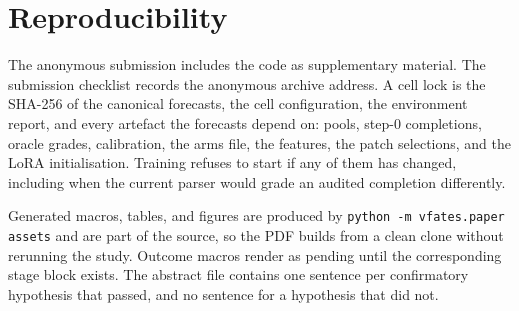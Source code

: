 \section{Reproducibility}
\label{app:repro}

The anonymous submission includes the code as supplementary material.
The submission checklist records the anonymous archive address.
A cell lock is the SHA-256 of the canonical forecasts, the cell configuration, the environment report, and every artefact the forecasts depend on: pools, step-0 completions, oracle grades, calibration, the arms file, the features, the patch selections, and the LoRA initialisation.
Training refuses to start if any of them has changed, including when the current parser would grade an audited completion differently.



Generated macros, tables, and figures are produced by \texttt{python -m vfates.paper assets} and are part of the source, so the PDF builds from a clean clone without rerunning the study.
Outcome macros render as pending until the corresponding stage block exists.
The abstract file contains one sentence per confirmatory hypothesis that passed, and no sentence for a hypothesis that did not.
